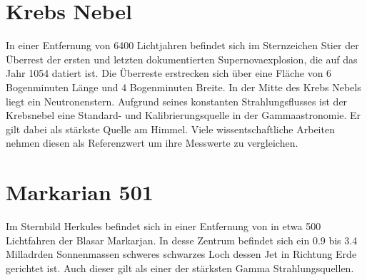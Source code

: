 \section{Krebs Nebel}
In einer Entfernung von 6400 Lichtjahren befindet sich im Sternzeichen Stier der Überrest der ersten und letzten dokumentierten Supernovaexplosion, die auf das Jahr 1054 datiert ist. 
Die Überreste erstrecken sich über eine Fläche von 6 Bogenminuten Länge und 4 Bogenminuten Breite. 
In der Mitte des Krebs Nebels liegt ein Neutronenstern.
Aufgrund seines konstanten Strahlungsflusses ist der Krebsnebel eine Standard- und Kalibrierungsquelle in der Gammaastronomie.
Er gilt dabei als stärkste Quelle am Himmel. 
Viele wissentschaftliche Arbeiten nehmen diesen als Referenzwert um ihre Messwerte zu vergleichen. 

\section{Markarian 501}
Im Sternbild Herkules befindet sich in einer Entfernung von in etwa 500 Lichtfahren der Blasar Markarjan. 
In desse Zentrum befindet sich ein \num{0.9} bis \num{3.4} Milladrden Sonnenmassen schweres schwarzes Loch dessen Jet in Richtung Erde gerichtet ist.
Auch dieser gilt als einer der stärksten Gamma Strahlungsquellen.
